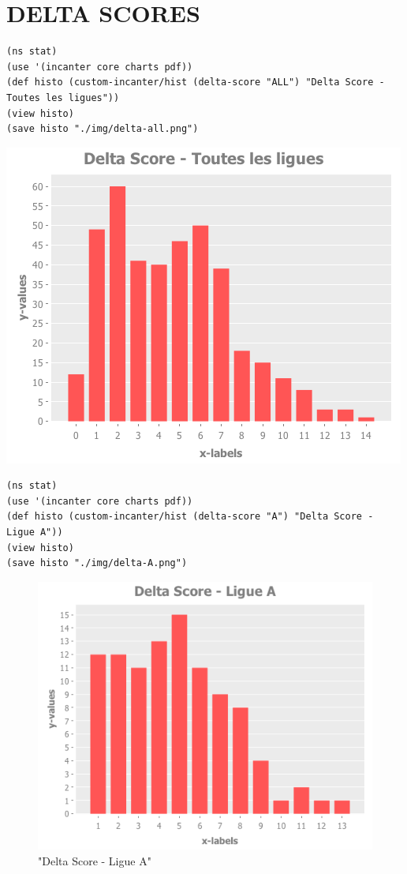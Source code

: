 \documentclass[11pt]{article}
\begin{document}
\section{DELTA SCORES}
\label{sec:org22f4c0d}

\begin{verbatim}
(ns stat)
(use '(incanter core charts pdf))
(def histo (custom-incanter/hist (delta-score "ALL") "Delta Score - Toutes les ligues"))
(view histo)
(save histo "./img/delta-all.png")
\end{verbatim}

\includegraphics[width=.9\linewidth]{./img/delta-all.png}


\begin{verbatim}
(ns stat)
(use '(incanter core charts pdf))
(def histo (custom-incanter/hist (delta-score "A") "Delta Score - Ligue A"))
(view histo)
(save histo "./img/delta-A.png")
\end{verbatim}

\begin{figure}[htb]
\centering
\includegraphics[width=.9\linewidth]{./img/delta-A.png}
\caption{\label{fig:orge6364e7}
"Delta Score - Ligue A"}
\end{figure}
\end{document}
